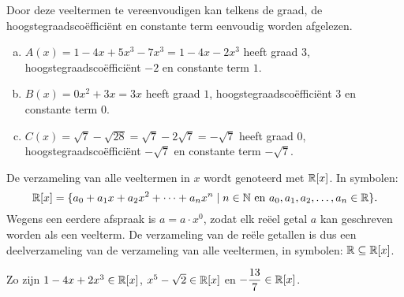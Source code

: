 \documentclass{ximera}
\begin{document}
\begin{example} 
Door deze veeltermen te vereenvoudigen kan telkens de graad, de hoogstegraadscoëfficiënt en constante term eenvoudig worden afgelezen. 
\begin{enumerate}[(a)]
\item
$A(x) = 1-4x+5x^3-7x^3 = 1 - 4x - 2x^3$ heeft graad $3$, hoogstegraadscoëfficiënt $-2$ en constante term $1$.
\item
$B(x) = 0x^2 + 3x = 3x$ heeft graad $1$, hoogstegraadscoëfficiënt $3$ en constante term $0$.
\item
$C(x) = \sqrt{7}-\sqrt{28} = \sqrt{7}-2\sqrt{7} = -\sqrt{7}$ heeft graad $0$, hoogstegraadscoëfficiënt $-\sqrt{7}$ en constante term $-\sqrt{7}$.
\end{enumerate}
\end{example} 


\begin{notation}

    De verzameling van alle veeltermen in $x$ wordt genoteerd met $\mathbb{R}[x]$. In symbolen:
    \[
    \mathbb{R}[x] = \{a_0 + a_1 x + a_2 x^2 + \dots + a_n x^n \mid \text{$n \in \mathbb{N}$ en $a_0,a_1,a_2,\ldots,a_n \in \mathbb{R}$} \}.
    \]
    Wegens een eerdere afspraak is $a = a\cdot x^0$, zodat elk reëel getal $a$ kan geschreven worden als een veelterm. De verzameling van de reële getallen is dus een deelverzameling
    van de verzameling van alle veeltermen, in symbolen: $\mathbb{R} \subseteq \mathbb{R}[x]$.
    
    
    \begin{example} 
       Zo zijn $1-4x+2x^3 \in \mathbb{R}[x]$, $x^5-\sqrt{2} \in \mathbb{R}[x]$ en $\displaystyle -\frac{13}{7} \in \mathbb{R}[x]$.   
    \end{example} 
    
\end{notation}




\renewcommand{\TJa}{\makebox[2.5cm]{een veelterm }}
\renewcommand{\TNee}{\makebox[2.5cm]{eeen veelterm}}
  
\end{document}
